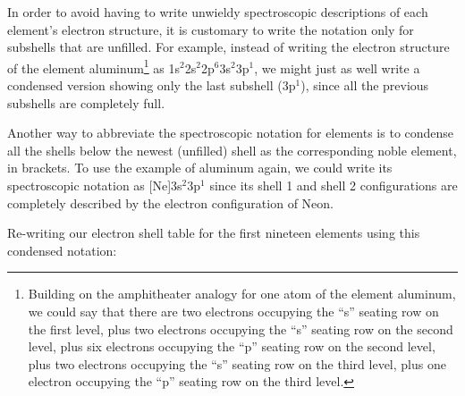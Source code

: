 In order to avoid having to write unwieldy spectroscopic descriptions of each element's electron structure, it is customary to write the notation only for subshells that are unfilled.  For example, instead of writing the electron structure of the element aluminum\footnote{Building on the amphitheater analogy for one atom of the element aluminum, we could say that there are two electrons occupying the ``s'' seating row on the first level, plus two electrons occupying the ``s'' seating row on the second level, plus six electrons occupying the ``p'' seating row on the second level, plus two electrons occupying the ``s'' seating row on the third level, plus one electron occupying the ``p'' seating row on the third level.} as 1s$^{2}$2s$^{2}$2p$^{6}$3s$^{2}$3p$^{1}$, we might just as well write a condensed version showing only the last subshell (3p$^{1}$), since all the previous subshells are completely full.

Another way to abbreviate the spectroscopic notation for elements is to condense all the shells below the newest (unfilled) shell as the corresponding noble element, in brackets.  To use the example of aluminum again, we could write its spectroscopic notation as [Ne]3s$^{2}$3p$^{1}$ since its shell 1 and shell 2 configurations are completely described by the electron configuration of Neon.  

\filbreak

Re-writing our electron shell table for the first nineteen elements using this condensed notation:


